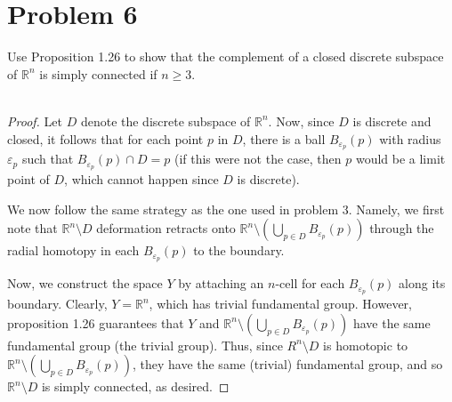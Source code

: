 \documentclass[fontsize=11pt]{scrartcl} %
\numberwithin{equation}{section} %
\numberwithin{figure}{section} %
\numberwithin{table}{section} %
\newcommand{\R}{\mathbb{R}}
\begin{document}
\newpage
\section*{Problem 6}
Use Proposition 1.26 to show that the complement of a closed discrete subspace
of $\R^n$ is simply connected if $n\geq 3$.
\\
\\
\begin{proof}
    Let $D$ denote the discrete subspace of $\R^n$. Now,
    since $D$ is discrete and closed, it follows that for each point $p$ in $D$,
    there is a ball $B_{\varepsilon_p}(p)$ with radius
    $\varepsilon_p$ such that $B_{\varepsilon_p}(p)\cap D = p$ (if this were
    not the case, then $p$ would be a limit point of $D$, which cannot
    happen since $D$ is discrete).

    We now follow the same strategy as the one used in problem 3. Namely, we
    first note that $\R^n\setminus D$ deformation retracts onto $\R^n\setminus
    (\bigcup_{p\in D}B_{\varepsilon_p}(p))$ through the radial homotopy in each
    $B_{\varepsilon_p}(p)$ to the boundary.

    Now, we construct the space $Y$ by attaching an $n$-cell for each
    $B_{\varepsilon_p}(p)$ along its boundary. Clearly, $Y=\R^n$, which has
    trivial fundamental group. However, proposition 1.26 guarantees that $Y$
    and $\R^n\setminus(\bigcup_{p\in D}B_{\varepsilon_p}(p))$ have the same
    fundamental group (the trivial group). Thus, since $R^n\setminus D$ is
    homotopic to $\R^n\setminus(\bigcup_{p\in D}B_{\varepsilon_p}(p))$, they
    have the same (trivial) fundamental group, and so $\R^n\setminus D$ is
    simply connected, as desired.
\end{proof}

\newpage
\end{document}
